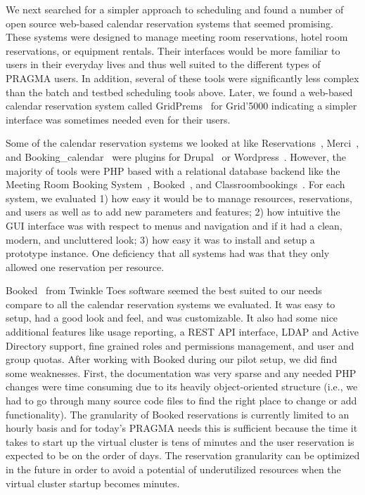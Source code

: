 \documentclass[times]{cpeauth}
\begin{document}
We next searched for a simpler approach to scheduling and found a number of open source web-based calendar reservation systems that seemed promising.  These systems were designed to manage meeting room reservations, hotel room reservations, or equipment rentals.   Their interfaces would be more familiar to users in their everyday lives and thus well suited to the different types of PRAGMA users.  In addition, several of these tools were significantly less complex than the batch and testbed scheduling tools above.  Later, we found a web-based calendar reservation system called GridPrems~\cite{gridprems} for Grid'5000 indicating a simpler interface was sometimes needed even for their users.

Some of the calendar reservation systems we looked at like Reservations~\cite{drupalreservations}, Merci~\cite{merci}, and Booking\_calendar~\cite{wordpressbooking} were plugins for Drupal~\cite{drupal} or Wordpress~\cite{wordpress}.  However, the majority of tools were PHP based with a relational database backend like the Meeting Room Booking System~\cite{mrbs}, Booked~\cite{booked}, and Classroombookings~\cite{classroombookings}.  For each system, we evaluated 1) how easy it would be to manage resources, reservations, and users as well as to add new parameters and features; 2) how intuitive the GUI interface was with respect to menus and navigation and if it had a clean, modern, and uncluttered look; 3)  how easy it was to install and setup a prototype instance. One deficiency that all systems had was that they only allowed one reservation per resource.

Booked~\cite{booked} from Twinkle Toes software seemed the best suited to our needs compare to all the calendar reservation systems we evaluated.  It was easy to setup, had  a good look and feel, and was customizable.  It also had some nice additional features like usage reporting, a REST API interface, LDAP and Active Directory support, fine grained roles and permissions management, and user and group quotas.  After working with Booked during our pilot setup, we did find some weaknesses.  First, the documentation was very sparse and any needed PHP changes were time consuming due to its heavily object-oriented structure (i.e., we had to go through many source code files to find the right place to change  or add functionality).   The granularity of Booked reservations is currently limited to an hourly basis and for today's PRAGMA needs this is sufficient because the time it takes to start up the virtual cluster 
is tens of minutes and  the user reservation is expected to  be on the order of days. The reservation granularity can be optimized in the future in order to avoid a potential of underutilized resources when the virtual cluster startup becomes minutes. 
\end{document}
